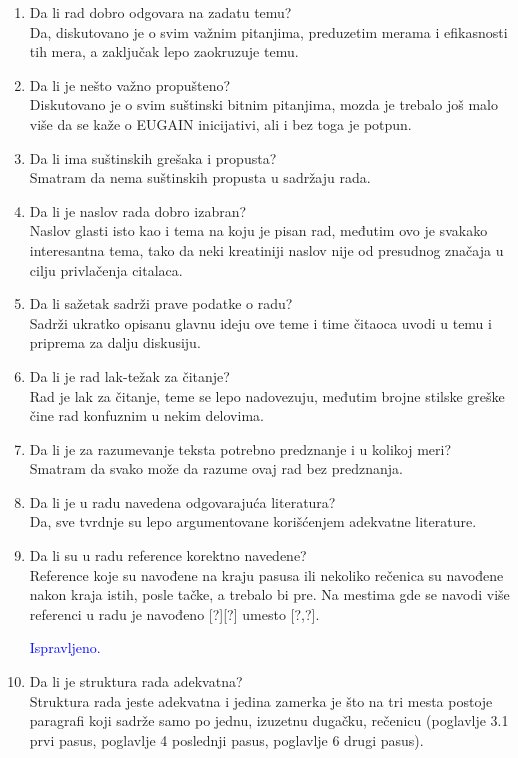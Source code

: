 \documentclass[a4paper]{report}
\newcommand{\odgovor}[1]{\textcolor{blue}{#1}}
\begin{document}
\begin{enumerate}
\item Da li rad dobro odgovara na zadatu temu?\\
Da, diskutovano je o svim važnim pitanjima, preduzetim merama i efikasnosti tih mera, a zaključak lepo zaokruzuje temu.
\item Da li je nešto važno propušteno?\\
Diskutovano je o svim suštinski bitnim pitanjima, mozda je trebalo još malo više da se kaže o EUGAIN inicijativi, ali i bez toga je potpun.
\item Da li ima suštinskih grešaka i propusta?\\
Smatram da nema suštinskih propusta u sadržaju rada.
\item Da li je naslov rada dobro izabran?\\
Naslov glasti isto kao i tema na koju je pisan rad, međutim ovo je svakako interesantna tema, tako da neki kreatiniji naslov nije od presudnog značaja u cilju privlačenja citalaca. 
\item Da li sažetak sadrži prave podatke o radu?\\
Sadrži ukratko opisanu glavnu ideju ove teme i time čitaoca uvodi u temu i priprema za dalju diskusiju.
\item Da li je rad lak-težak za čitanje?\\
Rad je lak za čitanje, teme se lepo nadovezuju, međutim brojne stilske greške čine rad konfuznim u nekim delovima.
\item Da li je za razumevanje teksta potrebno predznanje i u kolikoj meri?\\
Smatram da svako može da razume ovaj rad bez predznanja.
\item Da li je u radu navedena odgovarajuća literatura?\\
Da, sve tvrdnje su lepo argumentovane korišćenjem adekvatne literature.
\item Da li su u radu reference korektno navedene?\\
Reference koje su navođene na kraju pasusa ili nekoliko rečenica su navođene nakon kraja istih, posle tačke, a trebalo bi pre. Na mestima gde se navodi više referenci u radu je navođeno [?][?] umesto [?,?].

\odgovor{Ispravljeno.}
\item Da li je struktura rada adekvatna?\\
Struktura rada jeste adekvatna i jedina zamerka je što na tri mesta postoje paragrafi koji sadrže samo po jednu, izuzetnu dugačku, rečenicu (poglavlje 3.1 prvi pasus, poglavlje 4 poslednji pasus, poglavlje 6 drugi pasus).


\end{enumerate}
\end{document}
